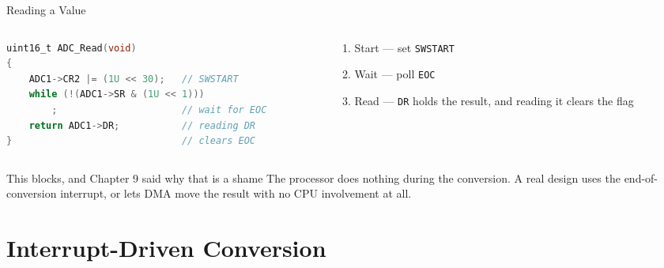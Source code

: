 \documentclass[9pt,aspectratio=169,xcolor=table]{beamer}
\begin{document}
\begin{frame}[fragile]{Reading a Value}
    \begin{columns}[T]
    \begin{column}{.52\textwidth}
\begin{lstlisting}[language=C, basicstyle=\ttfamily\scriptsize]
uint16_t ADC_Read(void)
{
    ADC1->CR2 |= (1U << 30);   // SWSTART
    while (!(ADC1->SR & (1U << 1)))
        ;                      // wait for EOC
    return ADC1->DR;           // reading DR
}                              // clears EOC
\end{lstlisting}
    \end{column}
    \begin{column}{.44\textwidth}
        \begin{enumerate}
            \item \alert{Start} --- set \texttt{SWSTART}
            \item \alert{Wait} --- poll \texttt{EOC}
            \item \alert{Read} --- \texttt{DR} holds the result, and reading it
                  clears the flag
        \end{enumerate}
    \end{column}
    \end{columns}

    \vspace{3mm}
    \begin{block}{This blocks, and Chapter 9 said why that is a shame}
        The processor does nothing during the conversion. A real design uses the
        \alert{end-of-conversion interrupt}, or lets \alert{DMA} move the result
        with no CPU involvement at all.
    \end{block}
\end{frame}


\section{Interrupt-Driven Conversion}
\end{document}
